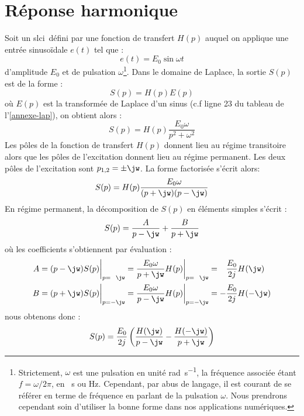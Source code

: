 \section*{Réponse harmonique}
Soit un \gls{slci}~défini par une fonction de transfert $H(p)$ auquel on 
applique une entrée sinuso\"idale $e(t)$ tel que :
\[
e(t)=E_0\sin\omega t 
\]
d'amplitude $E_0$ et de pulsation $\omega$\footnote{Strictement, $\omega$ est 
une pulsation en unité \si{\radian\per\second}, la fréquence associée étant 
$f=\omega/2\pi$, en \si{\per\second} ou \si{\hertz}. Cependant, par abus de 
langage, il est courant de se référer en terme de fréquence en parlant de la 
pulsation $\omega$. Nous prendrons cependant soin d'utiliser la bonne forme 
dans nos applications numériques.}. Dans le domaine de Laplace, la sortie $S(p)$
est de la forme :
\[
S(p)=H(p)E(p)
\]
où $E(p)$ est la transformée de Laplace d'un sinus (c.f ligne 23 du tableau de 
l'\cref{annexe-lap}), on obtient alors :
\[
S(p)=H(p)\dfrac{E_0\omega}{p^2+\omega^2}
\]
Les pôles de la fonction de transfert $H(p)$ donnent lieu au 
régime transitoire alors que les pôles de l'excitation donnent 
lieu au régime permanent. 
Les deux pôles de l'excitation sont $p_{1,2}=\pm\jw$. La forme factorisée 
s'écrit alors:
\[
S(p)=H(p)\dfrac{E_0\omega}{(p+\jw)(p-\jw)}
\]
En régime permanent, la décomposition de $S(p)$ en éléments simples s'écrit :
\[
S(p)=\dfrac{A}{p-\jw} + \dfrac{B}{p+\jw}
\]
où les coefficients s'obtiennent par évaluation :
\begin{align*}
    A&=(p-\jw)S(p)\bigg|_{p=\hphantom{-}\jw}=
       \dfrac{E_0\omega}{p+\jw}H(p)\bigg|_{p=\hphantom{-}\jw}=
       \hphantom{-}\dfrac{E_0}{2j}H(\jw)\\
    B&=(p+\jw)S(p)\bigg|_{p=-\jw}=
       \dfrac{E_0\omega}{p-\jw}H(p)\bigg|_{p=-\jw}=
       -\dfrac{E_0}{2j}H(-\jw)
\end{align*}
nous obtenons donc :
\[
S(p)=\dfrac{E_0}{2j}\left(\dfrac{H(\jw)}{p-\jw}-\dfrac{H(-\jw)}{p+\jw} \right)
\]
